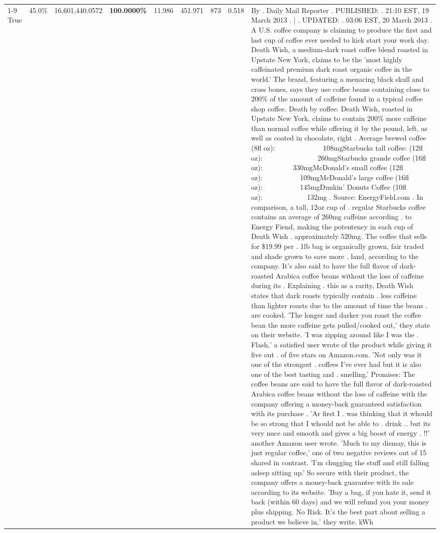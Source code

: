 \begin{table}[H]
{\begin{tabular}{lllrlllll}
\cline{1-9}
True & 45.0\% & 16,601,440.0572 & \bfseries \color{red} 100.0000\% & 11.986 & 451.971 & 873 & 0.518 & By . Daily Mail Reporter . PUBLISHED: . 21:10 EST, 19 March 2013 . | . UPDATED: . 03:06 EST, 20 March 2013 . A U.S. coffee company is claiming to produce the first and last cup of coffee ever needed to kick start your work day. Death Wish, a medium-dark roast coffee blend roasted in Upstate New York, claims to be the 'most highly caffeinated premium dark roast organic coffee in the world.' The brand, featuring a menacing black skull and cross bones, says they use coffee beans containing close to 200\% of the amount of caffeine found in a typical coffee shop coffee. Death by coffee: Death Wish, roasted in Upstate New York, claims to contain 200\% more caffeine than normal coffee while offering it by the pound, left, as well as coated in chocolate, right . Average brewed coffee (8fl oz):              108mgStarbucks tall coffee: (12fl oz):                260mgStarbucks grande coffee (16fl oz):         330mgMcDonald's small coffee (12fl oz):           109mgMcDonald's large coffee (16fl oz):           145mgDunkin' Donuts Coffee (10fl oz):             132mg . Source: EnergyField.com . In comparison, a tall, 12oz cup of . regular Starbucks coffee contains an average of 260mg caffeine according . to Energy Fiend, making the potentency in each cup of Death Wish . approximately 520mg. The coffee that sells for \$19.99 per . 1lb bag is organically grown, fair traded and shade grown to save more . land, according to the company. It's also said to have the full flavor of dark-roasted Arabica coffee beans without the loss of caffeine during its . Explaining . this as a rarity, Death Wish states that dark roasts typically contain . less caffeine than lighter roasts due to the amount of time the beans . are cooked. 'The longer and darker you roast the coffee bean the more caffeine gets pulled/cooked out,' they state on their website. 'I was zipping around like I was the . Flash,' a satisfied user wrote of the product while giving it five out . of five stars on Amazon.com. 'Not only was it one of the strongest . coffees I've ever had but it is also one of the best tasting and . smelling.’ Promises: The coffee beans are said to have the full flavor of dark-roasted Arabica coffee beans without the loss of caffeine with the company offering a money-back guaranteed satisfaction with its purchase . 'Ar first I . was thinking that it whould be so strong that I whould not be able to . drink .. but its very nuce and smooth and gives a big boost of energy . !!' another Amazon user wrote. 'Much to my dismay, this is just regular coffee,' one of two negative reviews out of 15 shared in contrast. 'I'm chugging the stuff and still falling asleep sitting up.' So secure with their product, the company offers a money-back guarantee with its sale according to its website. 'Buy a bag, if you hate it, send it back (within 60 days) and we will refund you your money plus shipping. No Risk. It’s the best part about selling a product we believe in,' they write. kWh \\

\end{tabular}}
\end{table}
